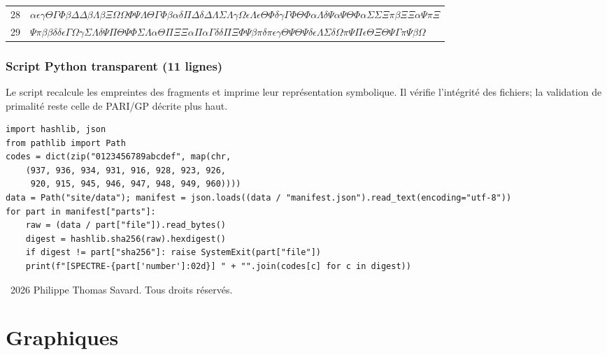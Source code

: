 \documentclass[11pt,a4paper]{article}
\begin{document}
\begin{boitecertificat}
{\begin{tabular}{@{}r l@{}}
28 & \textcolor{spectralargent}{$\alpha\epsilon\gamma\Theta\Gamma\Phi\beta\Delta\Delta\beta\Lambda\beta\Xi\Omega\Omega\Phi\Psi\Lambda\Theta\Gamma\Phi\beta\alpha\delta\Pi\Delta\delta\Delta\Lambda\Sigma\Lambda\gamma\Omega\epsilon\Lambda\epsilon\Theta\Phi\delta\gamma\Gamma\Phi\Theta\Phi\alpha\Lambda\delta\Psi\alpha\Psi\Theta\Phi\alpha\Sigma\Sigma\Xi\pi\beta\Xi\Xi\alpha\Psi\pi\Xi$} \\
29 & \textcolor{spectralargent}{$\Psi\pi\beta\beta\delta\delta\epsilon\Gamma\Omega\gamma\Sigma\Lambda\delta\Psi\Pi\Theta\Psi\Phi\Sigma\Lambda\alpha\Theta\Pi\Xi\Xi\alpha\Pi\alpha\Gamma\delta\delta\Pi\Xi\Phi\Psi\beta\pi\delta\pi\epsilon\gamma\Theta\Psi\Theta\Psi\delta\epsilon\Lambda\Sigma\delta\Omega\pi\Psi\Pi\epsilon\Theta\Xi\Theta\Psi\Gamma\pi\Psi\beta\Omega$} \\
\end{tabular}}
\end{boitecertificat}

\subsubsection*{Script Python transparent (11 lignes)}
Le script recalcule les empreintes des fragments et imprime leur représentation
symbolique. Il vérifie l'intégrité des fichiers; la validation de primalité
reste celle de PARI/GP décrite plus haut.
\begin{Verbatim}[fontsize=\scriptsize]
import hashlib, json
from pathlib import Path
codes = dict(zip("0123456789abcdef", map(chr,
    (937, 936, 934, 931, 916, 928, 923, 926,
     920, 915, 945, 946, 947, 948, 949, 960))))
data = Path("site/data"); manifest = json.loads((data / "manifest.json").read_text(encoding="utf-8"))
for part in manifest["parts"]:
    raw = (data / part["file"]).read_bytes()
    digest = hashlib.sha256(raw).hexdigest()
    if digest != part["sha256"]: raise SystemExit(part["file"])
    print(f"[SPECTRE-{part['number']:02d}] " + "".join(codes[c] for c in digest))
\end{Verbatim}

\noindent\textcopyright\ 2026 Philippe Thomas Savard. Tous droits réservés.

\section*{Graphiques}
\end{document}
